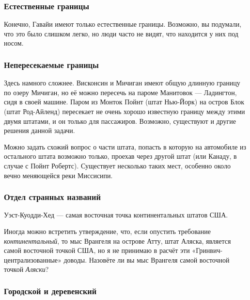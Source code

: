 \subsubsection*{Естественные границы}%

Конечно, Гавайи имеют только естественные границы.
Возможно, вы подумали, что это было слишком легко, но люди часто не видят, что находится у них под носом.
\heart

\subsubsection*{Непересекаемые границы}%

Здесь намного сложнее.
Висконсин и Мичиган имеют общую длинную границу по озеру Мичиган, но её можно пересечь на пароме Манитовок --- Ладингтон, сидя в своей машине.
Паром из Монток Пойнт %
(штат Нью-Йорк) на остров Блок %
(штат Род-Айленд) пересекает не очень хорошо известную границу между этими двумя штатами, и он только для пассажиров.
Возможно, существуют и другие решения данной задачи.\heart
                             

Можно задать схожий вопрос о части штата, попасть в которую на автомобиле из остального штата возможно только, проехав через другой штат (или Канаду, в случае с 
Пойнт Робертс). %
Существует несколько таких мест, особенно около вечно меняющейся реки Миссисипи.

\subsubsection*{Отдел странных названий}%

Уэст-Куодди-Хед %
--- самая восточная точка континентальных штатов США.\heart
                            

Иногда можно встретить утверждение, что, если опустить требование \emph{континентальный}, то мыс Врангеля %
на острове Атту, %
штат Аляска, является самой восточной точкой США, но я не принимаю в расчёт эти «Гринвич-централизованные» доводы.
Назовёте ли вы мыс Врангеля самой восточной точкой \emph{Аляски}?

\subsubsection*{Городской и деревенский}%

